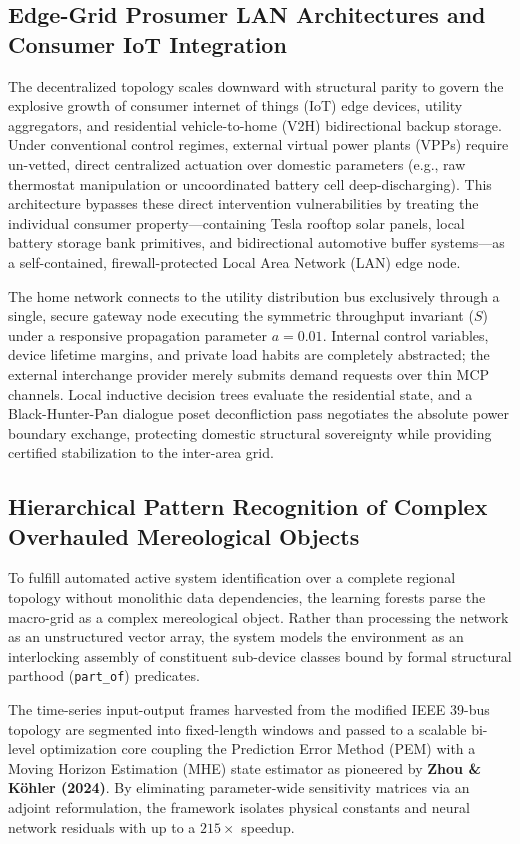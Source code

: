 \documentclass[11pt,fleqn]{article}
\begin{document}
\subsection{Edge-Grid Prosumer LAN Architectures and Consumer IoT Integration}
The decentralized topology scales downward with structural parity to govern the explosive growth of consumer internet of things (IoT) edge devices, utility aggregators, and residential vehicle-to-home (V2H) bidirectional backup storage. Under conventional control regimes, external virtual power plants (VPPs) require un-vetted, direct centralized actuation over domestic parameters (e.g., raw thermostat manipulation or uncoordinated battery cell deep-discharging). This architecture bypasses these direct intervention vulnerabilities by treating the individual consumer property---containing Tesla rooftop solar panels, local battery storage bank primitives, and bidirectional automotive buffer systems---as a self-contained, firewall-protected Local Area Network (LAN) edge node. 

The home network connects to the utility distribution bus exclusively through a single, secure gateway node executing the symmetric throughput invariant ($S$) under a responsive propagation parameter $a = 0.01$. Internal control variables, device lifetime margins, and private load habits are completely abstracted; the external interchange provider merely submits demand requests over thin MCP channels. Local inductive decision trees evaluate the residential state, and a Black-Hunter-Pan dialogue poset deconfliction pass negotiates the absolute power boundary exchange, protecting domestic structural sovereignty while providing certified stabilization to the inter-area grid.

\subsection{Hierarchical Pattern Recognition of Complex Overhauled Mereological Objects}
To fulfill automated active system identification over a complete regional topology without monolithic data dependencies, the learning forests parse the macro-grid as a complex mereological object. Rather than processing the network as an unstructured vector array, the system models the environment as an interlocking assembly of constituent sub-device classes bound by formal structural parthood (\texttt{part\_of}) predicates. 

The time-series input-output frames harvested from the modified IEEE 39-bus topology are segmented into fixed-length windows and passed to a scalable bi-level optimization core coupling the Prediction Error Method (PEM) with a Moving Horizon Estimation (MHE) state estimator as pioneered by \textbf{Zhou \& K{\"o}hler (2024)}. By eliminating parameter-wide sensitivity matrices via an adjoint reformulation, the framework isolates physical constants and neural network residuals with up to a $215\times$ speedup. 
\end{document}
